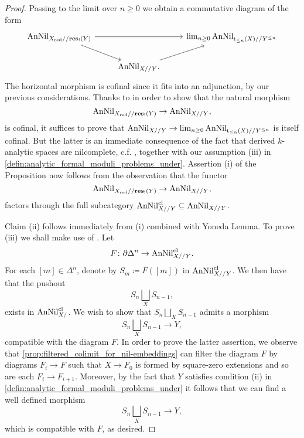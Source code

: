 \documentclass[10pt,a4paper,reqno]{amsart} %
\theoremstyle{plain}
\theoremstyle{definition}
\theoremstyle{remark}
\numberwithin{equation}{section}
\begin{document}
\begin{proof}
    Passing to the limit over $n \ge 0$ we obtain a commutative diagram of the form
        \[
        \begin{tikzcd}
            \anNil_{X_\red/ /\mathbf{res}_!(Y)} \ar{rr} \ar{rd} & & \lim_{n \ge 0} \anNil_{\rt_{\le n}(X)/ /Y^{\le n}} \\
                                                & \anNil_{X/ /Y} \ar{ur}.
        \end{tikzcd}
        \]  
    The horizontal morphism is cofinal since it fits into an adjunction, by our previous considerations. Thanks to \cite[]{HTT} in order to show that the natural morphism
        \[
            \mathrm{AnNil}_{X_{\mathrm{red}}/ /\mathbf{res}_!(Y)} \to \mathrm{AnNil}_{X/ /Y},
        \]
    is cofinal, it suffices to prove that $\mathrm{AnNil}_{X/ /Y} \to \lim_{n \ge 0} \mathrm{AnNil}_{\mathrm t_{\le n}(X)/ /Y^{\le n}}$ is itself cofinal. But the latter is an immediate consequence of
    the fact that derived $k$-analytic spaces are nilcomplete, c.f. \cite[Lemma 7.7]{Porta_Yu_Representability}, together with our assumption (iii) in \cref{defin:analytic_formal_moduli_problems_under}.
    Assertion (i) of the Proposition now follows from the observation that the functor
        \[
            \mathrm{AnNil}_{X_{\mathrm{red}}/ /\mathbf{res}_!(Y)} \to \mathrm{AnNil}_{X/ /Y},
        \]
    factors through the full subcategory $\mathrm{AnNil}_{X/ /Y}^{\mathrm{cl}} \subseteq \mathrm{AnNil}_{X/ /Y}$.
    
    Claim (ii) follows immediately from (i) combined with Yoneda Lemma. To prove (iii) we shall make use of \cite[Lemma 5.3.1.12]{HTT}. Let
        \[
            F \colon \partial \Delta^n \to \mathrm{AnNil}^{\mathrm{cl}}_{X//Y}.  
        \]
    For each $[m] \in \Delta^{n}$, denote by $S_m \coloneqq F([m]) $ in $\mathrm{AnNil}^{\mathrm{cl}}_{X//Y}$. We then have that the pushout
        \[
            S_n \bigsqcup_X S_{n-1},  
        \]
    exists in $\mathrm{AnNil}^{\mathrm{cl}}_{X/}$. We wish to show that $S_n \bigsqcup_X S_{n-1}$ admits a morphism
        \[S_n \bigsqcup_X S_{n-1} \to Y,\]
    compatible with the diagram $F$. In order to prove the latter assertion, we observe that \cref{prop:filtered_colimit_for_nil-embeddings} can filter the diagram $F$ by diagrams $F_i \to F$ such that $X \to F_0$ is formed by square-zero
    extensions and so are each $F_i \to F_{i+1}$. Moreover, by the fact that $Y$ satisfies condition (ii) in \cref{defin:analytic_formal_moduli_problems_under}
    it follows that we can find a well defined morphism
        \[
            S_n \bigsqcup_X S_{n-1} \to Y,  
        \]
    which is compatible with $F$, as desired.
\end{proof}
\end{document}

